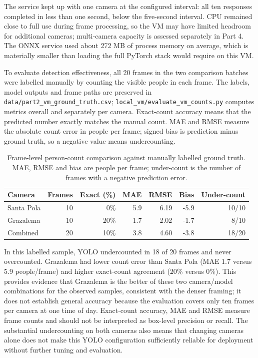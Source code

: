 \documentclass{article}
\begin{document}
    The service kept up with one camera at the configured interval: all ten responses completed in less than one second, below the five-second interval. CPU remained close to full use during frame processing, so the VM may have limited headroom for additional cameras; multi-camera capacity is assessed separately in Part 4. The ONNX service used about 272 MB of process memory on average, which is materially smaller than loading the full PyTorch stack would require on this VM.

    To evaluate detection effectiveness, all 20 frames in the two comparison batches were labelled manually by counting the visible people in each frame. The labels, model outputs and frame paths are preserved in \texttt{data/part2\_vm\_ground\_truth.csv}; \texttt{local\_vm/evaluate\_vm\_counts.py} computes metrics overall and separately per camera. Exact-count accuracy means that the predicted number exactly matches the manual count. MAE and RMSE measure the absolute count error in people per frame; signed bias is prediction minus ground truth, so a negative value means undercounting.

    \begin{table}[H]
        \centering
        \small
        \begin{tabular}{lrrrrrr}
            \toprule
            \textbf{Camera} & \textbf{Frames} & \textbf{Exact (\%)} & \textbf{MAE} & \textbf{RMSE} & \textbf{Bias} & \textbf{Under-count} \\
            \midrule
            Santa Pola & 10 & 0\% & 5.9 & 6.19 & -5.9 & 10/10 \\
            Grazalema & 10 & 20\% & 1.7 & 2.02 & -1.7 & 8/10 \\
            Combined & 20 & 10\% & 3.8 & 4.60 & -3.8 & 18/20 \\
            \bottomrule
        \end{tabular}
        \caption{Frame-level person-count comparison against manually labelled ground truth. MAE, RMSE and bias are people per frame; under-count is the number of frames with a negative prediction error.}
        \label{tab:camera-accuracy}
    \end{table}

    In this labelled sample, YOLO undercounted in 18 of 20 frames and never overcounted. Grazalema had lower count error than Santa Pola (MAE 1.7 versus 5.9 people/frame) and higher exact-count agreement (20\% versus 0\%). This provides evidence that Grazalema is the better of these two camera/model combinations for the observed samples, consistent with the denser framing; it does not establish general accuracy because the evaluation covers only ten frames per camera at one time of day. Exact-count accuracy, MAE and RMSE measure frame counts and should not be interpreted as box-level precision or recall. The substantial undercounting on both cameras also means that changing cameras alone does not make this YOLO configuration sufficiently reliable for deployment without further tuning and evaluation.
\end{document}
